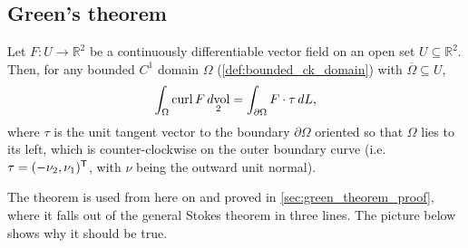 \subsection{Green's theorem}

\begin{theorem}
\label{thm:greens_theorem}
Let $F : U \to \mathbb{R}^2$ be a continuously differentiable vector field on an open set $U \subseteq \mathbb{R}^2$. Then, for any bounded $C^1$ domain $\Omega$ (\cref{def:bounded_ck_domain}) with $\overline\Omega \subseteq U$,
\[\int_\Omega \operatorname{curl} F \mathop{d\text{vol}}_2 = \int_{\partial\Omega} F \cdot \tau \,dL,\]
where $\tau$ is the unit tangent vector to the boundary $\partial\Omega$ oriented so that $\Omega$ lies to its left, which is counter-clockwise on the outer boundary curve (i.e.\ $\tau = (-\nu_2, \nu_1)^{\mathsf{T}}$, with $\nu$ being the outward unit normal).
\end{theorem}

The theorem is used from here on and proved in \cref{sec:green_theorem_proof}, where it falls out
of the general Stokes theorem in three lines. The picture below shows why it should be true.

